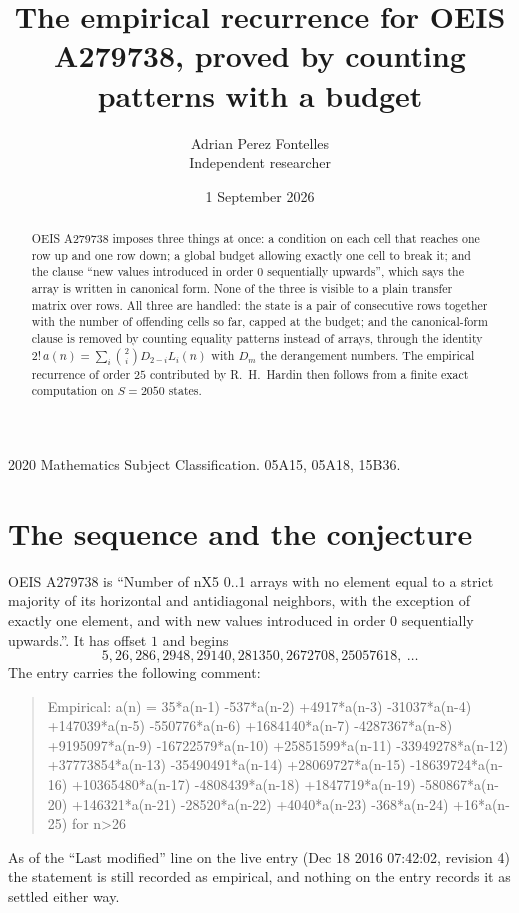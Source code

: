 \documentclass[11pt,a4paper]{article}
\title{The empirical recurrence for OEIS A279738, proved by counting patterns with a budget}
\author{Adrian Perez Fontelles\\ \small Independent researcher}
\date{1 September 2026}
\theoremstyle{plain}
\theoremstyle{definition}
\begin{document}
\maketitle

\begin{abstract}
OEIS A279738 imposes three things at once: a condition on each cell that reaches one row up and
one row down; a global budget allowing exactly one cell to
break it; and the clause ``new values introduced in order $0$ sequentially upwards'', which
says the array is written in canonical form. None of the three is visible to a plain transfer
matrix over rows. All three are handled: the state is a pair of consecutive rows
together with the number of offending cells so far, capped at the budget; and the
canonical-form clause is removed by counting equality patterns instead of arrays, through the
identity $2!\,a(n)=\sum_i\binom{2}{i}D_{2-i}L_i(n)$ with $D_m$ the derangement
numbers. The empirical recurrence of order $25$ contributed by R.~H.~Hardin then follows
from a finite exact computation on $S=2050$ states.
\end{abstract}

\noindent\small 2020 Mathematics Subject Classification. 05A15, 05A18, 15B36.\normalsize

\section{The sequence and the conjecture}

OEIS A279738 is ``Number of nX5 0..1 arrays with no element equal to a strict majority of its horizontal and antidiagonal neighbors, with the exception of exactly one element, and with new values introduced in order 0 sequentially upwards.''. It has offset $1$ and begins
\[
5, 26, 286, 2948, 29140, 281350, 2672708, 25057618,\ \dots
\]
The entry carries the following comment:
\begin{quote}\small
Empirical: a(n) = 35*a(n-1) -537*a(n-2) +4917*a(n-3) -31037*a(n-4) +147039*a(n-5) -550776*a(n-6) +1684140*a(n-7) -4287367*a(n-8) +9195097*a(n-9) -16722579*a(n-10) +25851599*a(n-11) -33949278*a(n-12) +37773854*a(n-13) -35490491*a(n-14) +28069727*a(n-15) -18639724*a(n-16) +10365480*a(n-17) -4808439*a(n-18) +1847719*a(n-19) -580867*a(n-20) +146321*a(n-21) -28520*a(n-22) +4040*a(n-23) -368*a(n-24) +16*a(n-25) for n>26
\end{quote}
As of the ``Last modified'' line on the live entry (Dec 18 2016 07:42:02, revision 4) the statement is
still recorded as empirical, and nothing on the entry records it as settled either way.
\end{document}
